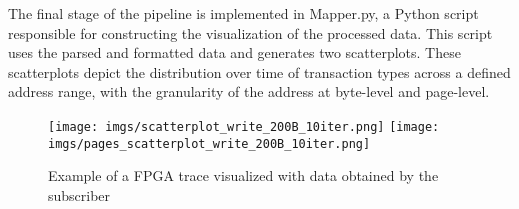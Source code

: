 


The final stage of the pipeline is implemented in Mapper.py, a Python script responsible for constructing the visualization of the processed data. This script uses the parsed and formatted data and generates two scatterplots. These scatterplots depict the distribution over time of transaction types across a defined address range, with the granularity of the address at byte-level and page-level.

\begin{figure}
            \centering
            \texttt{[image: imgs/scatterplot\_write\_200B\_10iter.png]}
            \texttt{[image: imgs/pages\_scatterplot\_write\_200B\_10iter.png]}
            \caption{Example of a FPGA trace visualized with data obtained by the subscriber}
            \label{fig:example_trace_visualized}
\end{figure}